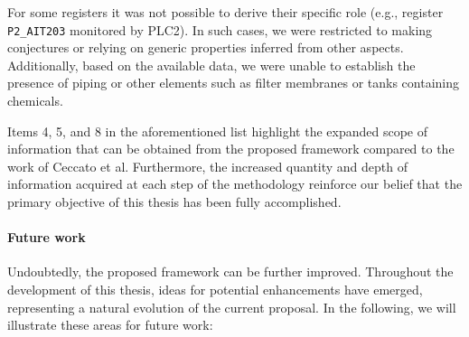 For some registers it was not possible to derive their specific role (e.g., register \texttt{P2\_AIT203} monitored by PLC2). In such cases, we were restricted to making conjectures or relying on generic properties inferred from other aspects. Additionally, based on the available data, we were unable to establish the presence of piping or other elements such as filter membranes or tanks containing chemicals.

\bigskip
Items 4, 5, and 8 in the aforementioned list highlight the expanded scope of information that can be obtained from the proposed framework compared to the work of Ceccato et al. Furthermore, the increased quantity and depth of information acquired at each step of the methodology reinforce our belief that the primary objective of this thesis has been fully accomplished.

\paragraph{Future work}
\label{par:7_futurework}
Undoubtedly, the proposed framework can be further improved. Throughout the development of this thesis, ideas for potential enhancements have emerged, representing a natural evolution of the current proposal. In the following, we will illustrate these areas for future work:

